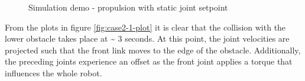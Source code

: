 \begin{figure}
    \hfil

    \caption{Simulation demo - propulsion with static joint setpoint}
    \label{fig:case2-1}
\end{figure}

From the plots in figure \ref{fig:case2-1-plot} it is clear that the collision with the lower obstacle takes place at \textasciitilde{} 3 seconds. At this point, the joint velocities are projected such that the front link moves to the edge of the obstacle. Additionally, the preceding joints experience an offset as the front joint applies a torque that influences the whole robot.

